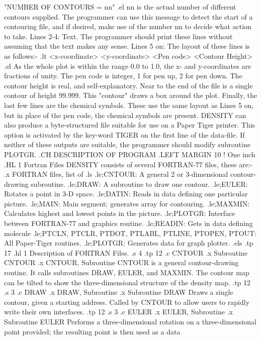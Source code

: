                     "NUMBER OF CONTOURS =  nn"
.el
 nn is the actual number of different contours supplied. The programmer
can use this message to detect the start of a contouring file, and if
desired, make use of the number nn to decide what action to take.
 Lines 2-4: Text. The programmer should print these lines without assuming
that the text makes any sense.
 Lines 5 on: The layout of these lines is as follows:-
.lt
<x-coordinate> <y-coordinate> <Pen code>  <Contour Height>
.el
As the whole plot is within the range 0.0 to 1.0, the x- and y-coordinates 
are fractions of unity. The pen code is integer, 1 for pen up, 2 for pen down.
The contour height is real, and self-explanatory.
 Near to the end of the file is a single contour of height 99.999. This "contour"
draws a box around the plot.
 Finally, the last few lines are the chemical symbols. These use the
same layout as Lines 5 on, but in place of the pen code, the chemical symbols
are present.
 DENSITY can also produce a byte-structured file suitable for use
on a Paper Tiger printer. This option is activated by the key-word TIGER
on the first line of the data-file. If neither of these outputs are
suitable, the programmer should modify subroutine PLOTGR.
.CH DESCRIPTION OF PROGRAM
.LEFT MARGIN 10                 ! One inch
.HL 1 Fortran Files
 DENSITY consists of several FORTRAN-77 files, these are:-
.x FORTRAN files, list of
.ls
.le;CNTOUR: A general 2 or 3-dimensional contour-drawing subroutine.
.le;DRAW: A subroutine to draw one contour.
.le;EULER: Rotates a point in 3-D space.
.le;DATIN: Reads in data defining one particular picture.
.le;MAIN: Main segment; generates array for contouring.
.le;MAXMIN: Calculates highest and lowest points in the picture.
.le;PLOTGR: Interface between FORTRAN-77 and graphics routine.
.le;READIN: Gets in data defining molecule
.le;PTCLN, PTCLR, PTDOT, PTLABL, PTLINE, PTOPEN, PTOUT: All Paper-Tiger
routines.
.le;PLOTGR: Generates data for graph plotter.
.els
.tp 17
.hl 1 Description of FORTRAN Files.
.s 4
.tp 12
.c
 CNTOUR
.x Subroutine CNTOUR
.x CNTOUR, Subroutine
 CNTOUR is a general contour-drawing routine. It calls subroutines
DRAW, EULER, and MAXMIN. The contour map can be tilted to show the
three-dimensional structure of the density map.
.tp 12
.s 3
.c
DRAW
.x DRAW, Subroutine
.x Subroutine DRAW
 Draws a single contour, given a starting address. Called by CNTOUR
to allow
users to rapidly write their own interfaces. 
.tp 12
.s 3
.c
EULER
.x EULER, Subroutine
.x Subroutine EULER
 Performs a three-dimensional rotation on a three-dimensional
point provided; the resulting point is then used as a data
